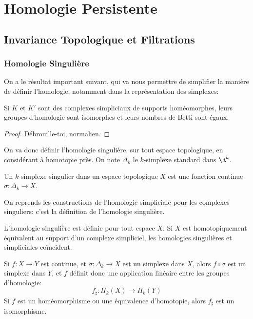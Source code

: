 \section{Homologie Persistente}
\subsection{Invariance Topologique et Filtrations}
\subsubsection{Homologie Singulière}
On a le résultat important suivant, qui va nous permettre de simplifier la manière de définir l'homologie,
notamment dans la représentation des simplexes:
\begin{thm}
	Si $K$ et $K'$ sont des complexes simpliciaux de supports homéomorphes, leurs groupes d'homologie sont
	isomorphes et leurs nombres de Betti sont égaux.
\end{thm}
\begin{proof}
	\og Débrouille-toi, normalien.\fg
\end{proof}

On va donc définir l'homologie singulière, sur tout espace topologique, en considérant à homotopie près. On note $\Delta_{k}$ le $k$-simplexe standard dans $\R^{k}$.
\begin{definition}
	Un $k$-simplexe singulier dans un espace topologique $X$ est une fonction continue $\sigma: \Delta_{k}\to X$.
\end{definition}

On reprends les constructions de l'homologie simpliciale pour les complexes singuliers: c'est la définition de l'homologie singulière.

\begin{proposition}
	L'homologie singulière est définie pour tout espace $X$. Si $X$ est homotopiquement équivalent au support
	d'un complexe simpliciel, les homologies singulières et simpliciales coïncident.
\end{proposition}

\begin{proposition}
	Si $f: X \to Y$ est continue, et $\sigma: \Delta_{k} \to X$ est un simplexe dans $X$, alors $f\circ \sigma$ est un simplexe dans $Y$, et $f$ définit donc une application linéaire entre les groupes d'homologie:
	\begin{equation*}
		f_{\sharp}: H_{k}(X) \to H_{k}(Y)
	\end{equation*}
	Si $f$ est un homéomorphisme ou une équivalence d'homotopie, alors $f_{\sharp}$ est un isomorphisme.
\end{proposition}

